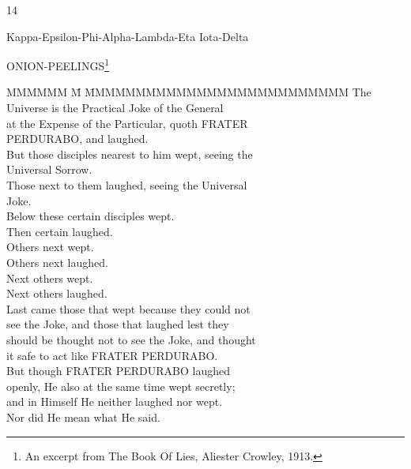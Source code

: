 

\clearpage{}

\rule{0em}{10em}

\begin{center}
                                  14

          {Kappa-Epsilon-Phi-Alpha-Lambda-Eta Iota-Delta}

                            ONION-PEELINGS\footnote{An excerpt from The Book Of Lies, Aliester Crowley, 1913.}
\end{center}

\begin{tabbing}
MMMMMM \= M \= MMMMMMMMMMMMMMMMMMMMMMMMMM \kill
\>  The Universe is the Practical Joke of the General \\
\>  \> at the Expense of the Particular, quoth FRATER \\
\>  \> PERDURABO, and laughed. \\
\>  But those disciples nearest to him wept, seeing the \\
\>  \> Universal Sorrow. \\
\>  Those next to them laughed, seeing the Universal \\
\>  \> Joke. \\
\>  Below these certain disciples wept. \\
\>  Then certain laughed. \\
\>  Others next wept. \\
\>  Others next laughed. \\
\>  Next others wept. \\
\>  Next others laughed. \\
\>  Last came those that wept because they could not \\
\>  \> see the Joke, and those that laughed lest they \\
\>  \> should be thought not to see the Joke, and thought \\
\>  \> it safe to act like FRATER PERDURABO. \\
\>  But though FRATER PERDURABO laughed \\
\>  \> openly, He also at the same time wept secretly; \\
\>  \> and in Himself He neither laughed nor wept. \\
\>  Nor did He mean what He said. \\
\end{tabbing}

